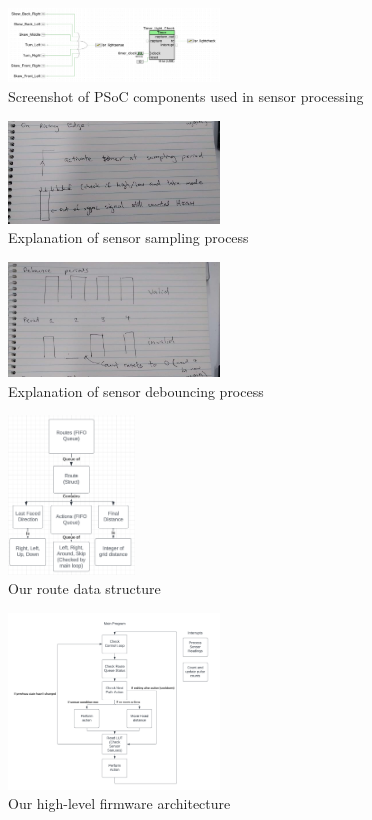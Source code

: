 \documentclass[conference]{IEEEtran}
\begin{document}
\begin{figure}[htbp]
	\centerline{\includegraphics[width=0.5\textwidth]{sensor-psoc.png}}
	\caption{Screenshot of PSoC components used in sensor processing}
	\label{fig:sensor-psoc}
\end{figure}

\begin{figure}[htbp]
	\centerline{\includegraphics[width=0.5\textwidth]{sensor-sampling.png}}
	\caption{Explanation of sensor sampling process}
	\label{fig:sensor-sampling}
\end{figure}
\begin{figure}[htbp]
	\centerline{\includegraphics[width=0.5\textwidth]{sensor-debouncing.png}}
	\caption{Explanation of sensor debouncing process}
	\label{fig:sensor-debouncing}
\end{figure}

\begin{figure}[htbp]
	\centerline{\includegraphics[width=0.3\textwidth]{pathfinding-route-struct.png}}
	\caption{Our route data structure}
	\label{fig:pathfinding-route-struct}
\end{figure}

\begin{figure}[htbp]
	\centerline{\includegraphics[width=0.5\textwidth]{integration-flowchart.png}}
	\caption{Our high-level firmware architecture}
	\label{fig:integration-flowchart}
\end{figure}
\end{document}
